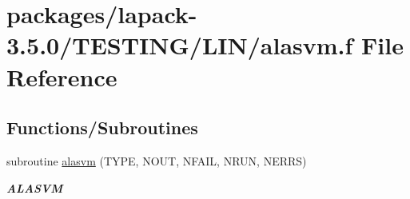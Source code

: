 \hypertarget{LIN_2alasvm_8f}{}\section{packages/lapack-\/3.5.0/\+T\+E\+S\+T\+I\+N\+G/\+L\+I\+N/alasvm.f File Reference}
\label{LIN_2alasvm_8f}
\subsection*{Functions/\+Subroutines}
\begin{DoxyCompactItemize}
\item 
subroutine \hyperlink{group__aux__lin_gad0cdc70e35bb8b07b0e95688e8d2123f}{alasvm} (T\+Y\+P\+E, N\+O\+U\+T, N\+F\+A\+I\+L, N\+R\+U\+N, N\+E\+R\+R\+S)
\begin{DoxyCompactList}\small\item\em {\bfseries A\+L\+A\+S\+V\+M} \end{DoxyCompactList}\end{DoxyCompactItemize}
